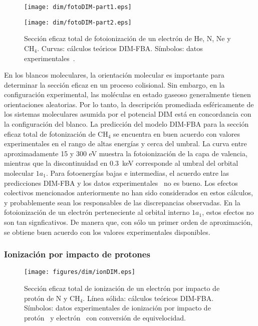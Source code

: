 \begin{figure}
\centering
\texttt{[image: dim/fotoDIM-part1.eps]} 

\vspace{-1.15cm}
\texttt{[image: dim/fotoDIM-part2.eps]}
\caption[Fotoionización de He, N, Ne y CH$_4$.]
{Sección eficaz total de fotoionización de un electrón de He, N, Ne y 
CH$_4$. Curvas: cálculos teóricos DIM-FBA. Símbolos: 
datos experimentales~\cite{Samson:90,Henke:93,Stolte:16,Samson:02,
Lukirskii:64,Henke:82,Samson:89}.}
\label{fig:photoDIM}
\end{figure}

En los blancos moleculares, la orientación molecular es importante para 
determinar la sección eficaz en un proceso colisional. Sin embargo, en 
la configuración experimental, las moléculas en estado gaseoso 
generalmente tienen orientaciones aleatorias. Por lo tanto, la 
descripción promediada esféricamente de los sistemas moleculares asumida 
por el potencial DIM está en concordancia con la configuración del 
blanco. La predicción del modelo DIM-FBA para la sección eficaz total de 
fotonización de CH$_4$ se encuentra en buen acuerdo con valores 
experimentales en el rango de altas energías y cerca del umbral. La 
curva entre aproximadamente 15 y 300 eV muestra la fotoionización de la 
capa de valencia, mientras que la discontinuidad en $0.3$~keV 
corresponde al umbral del orbital molecular $1a_1$. Para fotoenergías 
bajas e intermedias, el acuerdo entre las predicciones DIM-FBA y los 
datos experimentales~\cite{Lukirskii:64,Henke:82,Samson:89} no es bueno. 
Los efectos colectivos mencionados anteriormente no han sido 
considerados en estos cálculos, y probablemente sean los responsables de 
las discrepancias observadas. En la fotoionización de un electrón 
perteneciente al orbital interno $1a_1$, estos efectos no son tan 
signficativos. De manera que, con sólo un primer orden de aproximación, 
se obtiene buen acuerdo con los valores experimentales disponibles. 

\subsubsection{Ionización por impacto de protones}

\begin{figure}[t]
\centering
\texttt{[image: figures/dim/ionDIM.eps]}
\caption[Ionización por impacto de protón de N y CH$_4$.]
{Sección eficaz total de ionización de un electrón por impacto de protón 
de N y CH$_4$. Línea sólida: cálculos teóricos DIM-FBA. 
Símbolos: datos experimentales de ionización por impacto de 
protón~\cite{Rudd:83,Rudd:85} y electrón~\cite{Brook:78} con conversión 
de equivelocidad.}
\label{fig:iondim}
\end{figure}

